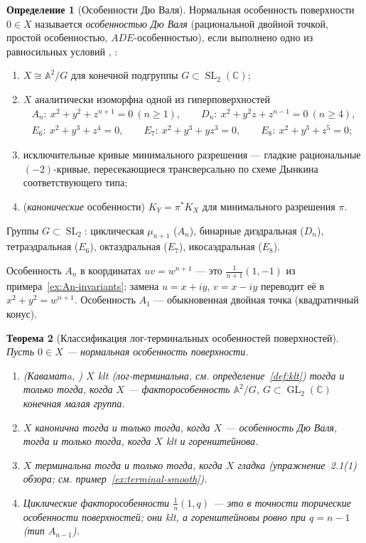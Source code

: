 \documentclass[11pt,a4paper]{article}
\theoremstyle{plain}
\newtheorem{theorem}{Теорема}[section]
\theoremstyle{definition}
\newtheorem{definition}[theorem]{Определение}
\theoremstyle{remark}
\renewcommand{\C}{\mathbb{C}}
\newcommand{\A}{\mathbb{A}}
\DeclareMathOperator{\GL}{GL}
\DeclareMathOperator{\SL}{SL}
\begin{document}
\begin{definition}[Особенности Дю Валя]\label{def:DuVal}
Нормальная особенность поверхности $0\in X$ называется \emph{особенностью Дю Валя} (рациональной
двойной точкой, простой особенностью, $ADE$-особенностью), если выполнено одно из равносильных
условий \cite{Durfee}, \cite[4.20]{KM}:
\begin{enumerate}
\item $X\cong\A^2/G$ для конечной подгруппы $G\subset\SL_2(\C)$;
\item $X$ аналитически изоморфна одной из гиперповерхностей
\begin{gather*}
A_n:\ x^2+y^2+z^{n+1}=0\ (n\ge1),\qquad D_n:\ x^2+y^2z+z^{n-1}=0\ (n\ge4),\\
E_6:\ x^2+y^3+z^4=0,\qquad E_7:\ x^2+y^3+yz^3=0,\qquad E_8:\ x^2+y^3+z^5=0;
\end{gather*}
\item исключительные кривые минимального разрешения --- гладкие рациональные $(-2)$-кривые,
пересекающиеся трансверсально по схеме Дынкина соответствующего типа;
\item (\emph{канонические} особенности) $K_Y=\pi^*K_X$ для минимального разрешения $\pi$.
\end{enumerate}
Группы $G\subset\SL_2$: циклическая $\mu_{n+1}$ ($A_n$), бинарные диэдральная ($D_n$),
тетраэдральная ($E_6$), октаэдральная ($E_7$), икосаэдральная ($E_8$).
\end{definition}

Особенность $A_n$ в координатах $uv=w^{n+1}$ --- это $\frac1{n+1}(1,-1)$ из
примера~\ref{ex:An-invariants}; замена $u=x+iy$, $v=x-iy$ переводит её в $x^2+y^2=w^{n+1}$.
Особенность $A_1$ --- обыкновенная двойная точка (квадратичный конус).

\begin{theorem}[Классификация лог-терминальных особенностей поверхностей]\label{thm:lt-surface}
Пусть $0\in X$ --- нормальная особенность поверхности.
\begin{enumerate}
\item \textup{(}Каваматa, \cite[4.18]{KM}\textup{)} $X$ klt \textup{(}лог-терминальна, см. определение~\ref{def:klt}\textup{)} тогда и
только тогда, когда $X$ --- факторособенность $\A^2/G$, $G\subset\GL_2(\C)$ конечная малая группа.
\item $X$ канонична тогда и только тогда, когда $X$ --- особенность Дю Валя, тогда и только тогда,
когда $X$ klt и горенштейнова.
\item $X$ терминальна тогда и только тогда, когда $X$ гладка \textup{(}упражнение~2.1\textup{(}1\textup{)} обзора; см.
пример~\ref{ex:terminal-smooth}\textup{)}.
\item Циклические факторособенности $\frac1n(1,q)$ --- это в точности торические особенности
поверхностей; они klt, а горенштейновы ровно при $q=n-1$ \textup{(}тип $A_{n-1}$\textup{)}.
\end{enumerate}
\end{theorem}
\end{document}
